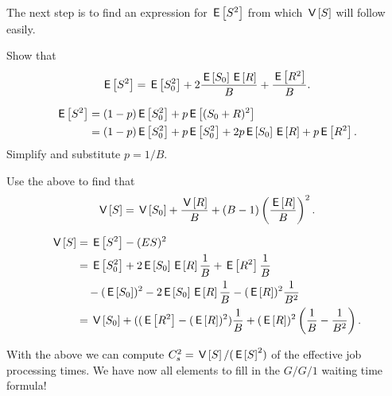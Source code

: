 The next step is to find an expression for $\E{S^2}$ from which $\V{S}$ will follow easily.

\begin{exercise}[\faCalculator]
  Show that
  \begin{equation*}
    \E{S^2} = \E{S_0^2} + 2\frac{\E{S_0}\E{R}} B + \frac{\E{R^2}}B.
  \end{equation*}
  \begin{solution}
  \begin{align*}
    \E{S^2} 
&= (1-p) \E{S_0^2} + p \E{(S_0+R)^2}\\
&= (1-p) \E{S_0^2} + p \E{S_0^2}  + 2 p \E{S_0} \E R + p \E{R^2}. 
  \end{align*}
  Simplify and substitute $p=1/B$. 
  \end{solution}
\end{exercise}

\begin{exercise}[\faCalculator]
  Use the above to find that
  \begin{equation*}
    \V{S} = \V{S_0} + \frac{\V{R}} B + (B-1)\left(\frac{\E R}{B}\right)^2.
  \end{equation*}
  \begin{solution}
    \begin{equation*}
      \begin{split}
\V{S} 
&=\E{S^2} - (E{S})^2 \\
&= \E{S_0^2} + 2 \E{S_0} \E R\frac 1B + \E{R^2}\frac 1B  \\
&\quad - (\E{S_0})^2 - 2\E{S_0}\E R \frac 1 B - (\E R)^2\frac1{B^2}\\
&=  \V{S_0} + ((\E{R^2} - (\E R)^2)\frac 1 B + (\E R)^2\left(\frac 1B - \frac 1{B^2}\right).
      \end{split}
    \end{equation*}
  \end{solution}
\end{exercise}

With the above we can compute $C_s^2=\V{S}/(\E{S}^2)$ of the effective job processing times. We have now all elements to fill in the $G/G/1$ waiting time formula!

